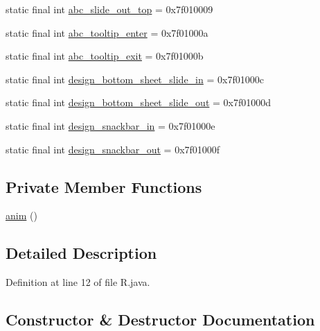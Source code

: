 \begin{DoxyCompactItemize}
static final int \mbox{\hyperlink{classandroid_1_1support_1_1design_1_1_r_1_1anim_add316245c738f2bbdc588fcd7b8673fe}{abc\+\_\+slide\+\_\+out\+\_\+top}} = 0x7f010009
\item 
static final int \mbox{\hyperlink{classandroid_1_1support_1_1design_1_1_r_1_1anim_a29429215f8e1520f4cda12fa5129babe}{abc\+\_\+tooltip\+\_\+enter}} = 0x7f01000a
\item 
static final int \mbox{\hyperlink{classandroid_1_1support_1_1design_1_1_r_1_1anim_a76ea8daac7b938a103b29abcdab972bc}{abc\+\_\+tooltip\+\_\+exit}} = 0x7f01000b
\item 
static final int \mbox{\hyperlink{classandroid_1_1support_1_1design_1_1_r_1_1anim_a25fb314be1be57716c26ce894d7a7154}{design\+\_\+bottom\+\_\+sheet\+\_\+slide\+\_\+in}} = 0x7f01000c
\item 
static final int \mbox{\hyperlink{classandroid_1_1support_1_1design_1_1_r_1_1anim_a6e946b8501d7cb528bbf18f3d4a2da72}{design\+\_\+bottom\+\_\+sheet\+\_\+slide\+\_\+out}} = 0x7f01000d
\item 
static final int \mbox{\hyperlink{classandroid_1_1support_1_1design_1_1_r_1_1anim_a9930bdac625232a9e03a5a9746dd8380}{design\+\_\+snackbar\+\_\+in}} = 0x7f01000e
\item 
static final int \mbox{\hyperlink{classandroid_1_1support_1_1design_1_1_r_1_1anim_acf11f1948085305ee3c0caf4c4a043c3}{design\+\_\+snackbar\+\_\+out}} = 0x7f01000f
\end{DoxyCompactItemize}
\subsection*{Private Member Functions}
\begin{DoxyCompactItemize}
\item 
\mbox{\hyperlink{classandroid_1_1support_1_1design_1_1_r_1_1anim_a56a82345f80c188f4c01fa54f2439216}{anim}} ()
\end{DoxyCompactItemize}


\subsection{Detailed Description}


Definition at line 12 of file R.\+java.



\subsection{Constructor \& Destructor Documentation}
\mbox{\label{classandroid_1_1support_1_1design_1_1_r_1_1anim_a56a82345f80c188f4c01fa54f2439216}} 

